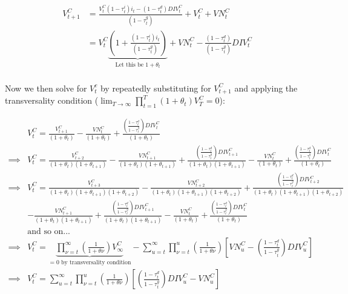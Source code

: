 \begin{equation}
\label{eqn:v_t1}
\begin{split}
V^{C}_{t+1}&=\frac{V^{C}_{t}(1-\tau^{i}_{t})i_{t}-(1-\tau^{d}_{t})DIV^{C}_{t}}{(1-\tau^{g}_{t})}+V^{C}_{t}+VN^{C}_{t} \\
 & = V^{C}_{t}\underbrace{\left(1+\frac{(1-\tau^{i}_{t})i_{t}}{(1-\tau^{g}_{t})}\right)}_{\text{Let this be }1+\theta_{t}} + VN^{C}_{t} - \frac{(1-\tau^{d}_{t})}{(1-\tau^{g}_{t})}DIV^{C}_{t} \\
\end{split}
\end{equation}

\noindent\noindent Now we then solve for $V^{c}_{t}$ by repeatedly substituting for $V^{C}_{t+1}$ and applying the transversality condition ($\lim_{T \to \infty} \prod_{t=1}^{T}(1+\theta_{t})V^{C}_{T}=0$):

\begin{equation}
\label{eqn:solve_vs}
\begin{split}
& V^{C}_{t}=\frac{V^{C}_{t+1}}{(1+\theta_{t})} - \frac{VN^{C}_{t}}{(1+\theta_{t})}  + \frac{\left(\frac{1-\tau^{d}_{t}}{1-\tau^{g}_{t}}\right)DIV^{C}_{t}}{(1+\theta_{t})} \\
\implies &  V^{C}_{t}=\frac{V^{C}_{t+2}}{(1+\theta_{t})(1+\theta_{t+1})} - \frac{VN^{C}_{t+1}}{(1+\theta_{t})(1+\theta_{t+1})}  + \frac{\left(\frac{1-\tau^{d}_{t}}{1-\tau^{g}_{t}}\right)DIV^{C}_{t+1}}{(1+\theta_{t})(1+\theta_{t+1})} - \frac{VN^{C}_{t}}{(1+\theta_{t})}  + \frac{\left(\frac{1-\tau^{d}_{t}}{1-\tau^{g}_{t}}\right)DIV^{C}_{t}}{(1+\theta_{t})} \\
\implies &  V^{C}_{t}= \frac{V^{C}_{t+3}}{(1+\theta_{t})(1+\theta_{t+1})(1+\theta_{t+2})} - \frac{VN^{C}_{t+2}}{(1+\theta_{t})(1+\theta_{t+1})(1+\theta_{t+2})}  + \frac{\left(\frac{1-\tau^{d}_{t}}{1-\tau^{g}_{t}}\right)DIV^{C}_{t+2}}{(1+\theta_{t})(1+\theta_{t+1})(1+\theta_{t+2})} \\
& - \frac{VN^{C}_{t+1}}{(1+\theta_{t})(1+\theta_{t+1})}  + \frac{\left(\frac{1-\tau^{d}_{t}}{1-\tau^{g}_{t}}\right)DIV^{C}_{t+1}}{(1+\theta_{t})(1+\theta_{t+1})} - \frac{VN^{C}_{t}}{(1+\theta_{t})}  + \frac{\left(\frac{1-\tau^{d}_{t}}{1-\tau^{g}_{t}}\right)DIV^{C}_{t}}{(1+\theta_{t})} \\
& \text{and so on...} \\
\implies & V^{C}_{t}=\underbrace{\prod_{\nu=t}^{\infty}\left(\frac{1}{1+\theta{\nu}}\right)V^{C}_{\infty}}_{=0 \text{ by transversality condition}} - \sum_{u=t}^{\infty} \prod_{\nu=t}^{u}\left(\frac{1}{1+\theta{\nu}}\right)\left[VN^{C}_{u} - \left(\frac{1-\tau^{d}_{t}}{1-\tau^{g}_{t}}\right)DIV^{C}_{u}\right]\\
\implies & V^{C}_{t}= \sum_{u=t}^{\infty} \prod_{\nu=t}^{u}\left(\frac{1}{1+\theta{\nu}}\right)\left[ \left(\frac{1-\tau^{d}_{t}}{1-\tau^{g}_{t}}\right)DIV^{C}_{u}-VN^{C}_{u}\right]\\
\end{split}
\end{equation}

